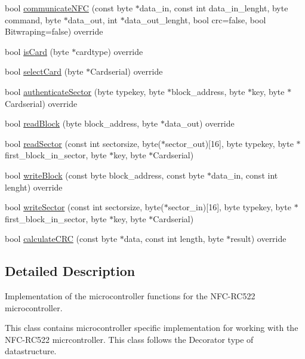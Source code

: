 \begin{DoxyCompactItemize}
\item 
bool \hyperlink{class_r_c522_aa8ec37f7914b3aa1e3866dda7e08063f}{communicate\+N\+FC} (const byte $\ast$data\+\_\+in, const int data\+\_\+in\+\_\+lenght, byte command, byte $\ast$data\+\_\+out, int $\ast$data\+\_\+out\+\_\+lenght, bool crc=false, bool Bitwraping=false) override
\item 
bool \hyperlink{class_r_c522_a6cef2c82c923eeed59bd3cb5e7a42090}{is\+Card} (byte $\ast$cardtype) override
\item 
bool \hyperlink{class_r_c522_a2b41c31a04a41b6098945b0fddcf1476}{select\+Card} (byte $\ast$Cardserial) override
\item 
bool \hyperlink{class_r_c522_a84000801a44a02cf59601400b809f5a3}{authenticate\+Sector} (byte typekey, byte $\ast$block\+\_\+address, byte $\ast$key, byte $\ast$Cardserial) override
\item 
bool \hyperlink{class_r_c522_a4a9843ee47bd24f6446bb8c327411076}{read\+Block} (byte block\+\_\+address, byte $\ast$data\+\_\+out) override
\item 
bool \hyperlink{class_r_c522_a6c6409ef5f4385e9d1efac5b2f9caed0}{read\+Sector} (const int sectorsize, byte($\ast$sector\+\_\+out)\mbox{[}16\mbox{]}, byte typekey, byte $\ast$first\+\_\+block\+\_\+in\+\_\+sector, byte $\ast$key, byte $\ast$Cardserial)
\item 
bool \hyperlink{class_r_c522_a42c197d61571667a97176f7294b0a8dd}{write\+Block} (const byte block\+\_\+address, const byte $\ast$data\+\_\+in, const int lenght) override
\item 
bool \hyperlink{class_r_c522_a11e060e686331017873edd877c3255cd}{write\+Sector} (const int sectorsize, byte($\ast$sector\+\_\+in)\mbox{[}16\mbox{]}, byte typekey, byte $\ast$first\+\_\+block\+\_\+in\+\_\+sector, byte $\ast$key, byte $\ast$Cardserial)
\item 
bool \hyperlink{class_r_c522_a851317030e6ad460210c136fd8f961fa}{calculate\+C\+RC} (const byte $\ast$data, const int length, byte $\ast$result) override
\end{DoxyCompactItemize}


\subsection{Detailed Description}
Implementation of the microcontroller functions for the N\+F\+C-\/\+R\+C522 microcontroller.

This class contains microcontroller specific implementation for working with the N\+F\+C-\/\+R\+C522 micrcontroller. This class follows the Decorator type of datastructure. 

